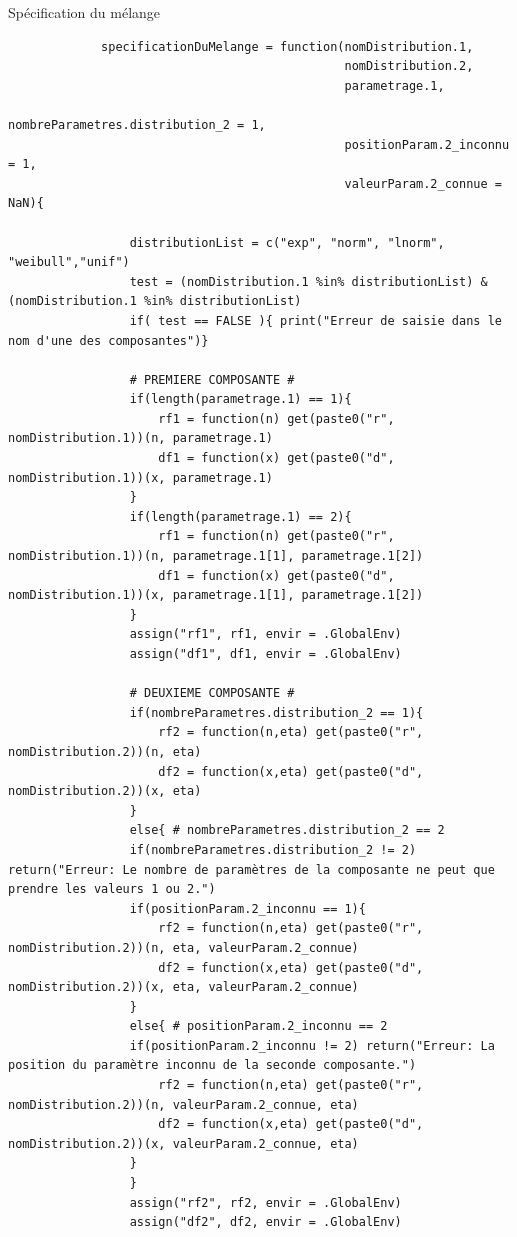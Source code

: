 \documentclass{article}
\begin{document}
     \begin{script}[h!]
         \caption{Spécification du mélange}
         \begin{verbatim}
             specificationDuMelange = function(nomDistribution.1, 
                                               nomDistribution.2, 
                                               parametrage.1, 
                                               nombreParametres.distribution_2 = 1,
                                               positionParam.2_inconnu = 1,
                                               valeurParam.2_connue = NaN){
 
                 distributionList = c("exp", "norm", "lnorm", "weibull","unif")
                 test = (nomDistribution.1 %in% distributionList) & (nomDistribution.1 %in% distributionList)
                 if( test == FALSE ){ print("Erreur de saisie dans le nom d'une des composantes")}
 
                 # PREMIERE COMPOSANTE # 
                 if(length(parametrage.1) == 1){
                     rf1 = function(n) get(paste0("r", nomDistribution.1))(n, parametrage.1) 
                     df1 = function(x) get(paste0("d", nomDistribution.1))(x, parametrage.1)
                 }
                 if(length(parametrage.1) == 2){
                     rf1 = function(n) get(paste0("r", nomDistribution.1))(n, parametrage.1[1], parametrage.1[2])
                     df1 = function(x) get(paste0("d", nomDistribution.1))(x, parametrage.1[1], parametrage.1[2])
                 }
                 assign("rf1", rf1, envir = .GlobalEnv)
                 assign("df1", df1, envir = .GlobalEnv)
 
                 # DEUXIEME COMPOSANTE #
                 if(nombreParametres.distribution_2 == 1){
                     rf2 = function(n,eta) get(paste0("r", nomDistribution.2))(n, eta)
                     df2 = function(x,eta) get(paste0("d", nomDistribution.2))(x, eta)
                 }
                 else{ # nombreParametres.distribution_2 == 2
                 if(nombreParametres.distribution_2 != 2) return("Erreur: Le nombre de paramètres de la composante ne peut que prendre les valeurs 1 ou 2.")
                 if(positionParam.2_inconnu == 1){
                     rf2 = function(n,eta) get(paste0("r", nomDistribution.2))(n, eta, valeurParam.2_connue)
                     df2 = function(x,eta) get(paste0("d", nomDistribution.2))(x, eta, valeurParam.2_connue)
                 }
                 else{ # positionParam.2_inconnu == 2
                 if(positionParam.2_inconnu != 2) return("Erreur: La position du paramètre inconnu de la seconde composante.")
                     rf2 = function(n,eta) get(paste0("r", nomDistribution.2))(n, valeurParam.2_connue, eta)
                     df2 = function(x,eta) get(paste0("d", nomDistribution.2))(x, valeurParam.2_connue, eta)
                 }
                 }
                 assign("rf2", rf2, envir = .GlobalEnv)
                 assign("df2", df2, envir = .GlobalEnv)
 

\end{verbatim}
\end{script}
\end{document}
